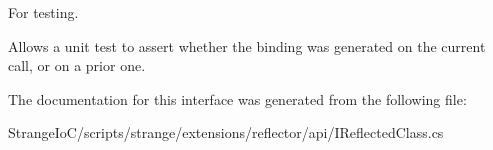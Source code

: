 For testing. 

Allows a unit test to assert whether the binding was generated on the current call, or on a prior one. 

The documentation for this interface was generated from the following file\-:\begin{DoxyCompactItemize}
\item 
Strange\-Io\-C/scripts/strange/extensions/reflector/api/I\-Reflected\-Class.\-cs\end{DoxyCompactItemize}
